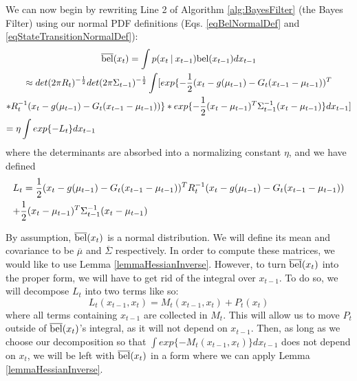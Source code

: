 We can now begin by rewriting Line 2 of Algorithm \ref{alg:BayesFilter} (the Bayes Filter) using our normal PDF definitions (Eqs. \ref{eqBelNormalDef} and \ref{eqStateTransitionNormalDef}):
\begin{multline} \label{eqBelBarLt}
\overline{\bel}(x_t) = \int p(x_t \mathbin{\vert} x_{t-1}) \bel(x_{t-1})dx_{t-1} \\
\approx det(2 \pi R_t)^{-\frac{1}{2}} det(2 \pi \Sigma_{t-1})^{-\frac{1}{2}} \int [ exp\{-\frac{1}{2} (x_t - g(\mu_{t-1}) - G_t (x_{t-1} - \mu_{t-1}))^T \\ * R_t^{-1} (x_t - g(\mu_{t-1}) - G_t (x_{t-1} - \mu_{t-1}))\} * exp \{-\frac{1}{2} (x_t - \mu_{t-1})^T \Sigma_{t-1}^{-1} (x_t - \mu_{t-1}) \}dx_{t-1} ] \\
= \eta \int exp\{-L_t\}dx_{t-1} \hfill
\end{multline}
where the determinants are absorbed into a normalizing constant \(\eta\), and we have defined
\begin{multline}
L_t = \frac{1}{2} (x_t - g(\mu_{t-1}) - G_t (x_{t-1} - \mu_{t-1}))^T R_t^{-1} (x_t - g(\mu_{t-1}) - G_t (x_{t-1} - \mu_{t-1}))\\
+ \frac{1}{2} (x_t - \mu_{t-1})^T \Sigma_{t-1}^{-1} (x_t - \mu_{t-1}) \hfill
\end{multline}

By assumption, \(\overline{\mathrm{bel}}(x_t)\) is a normal distribution. We will define its mean and covariance to be \(\overline{\mu}\) and \(\overline{\Sigma}\) respectively. In order to compute these matrices, we would like to use Lemma \ref{lemmaHessianInverse}. However, to turn \(\overline{\mathrm{bel}}(x_t)\) into the proper form, we will have to get rid of the integral over \(x_{t-1}\). To do so, we will decompose \(L_t\) into two terms like so: \begin{equation} \label{eqLtDecomp}
L_t(x_{t-1},x_t) = M_t(x_{t-1},x_t) + P_t(x_t)
\end{equation}
where all terms containing \(x_{t-1}\) are collected in \(M_t\). This will allow us to move \(P_t\) outside of \(\overline{\mathrm{bel}}(x_t)\)'s integral, as it will not depend on \(x_{t-1}\). Then, as long as we choose our decomposition so that \(\int exp\{ -M_t(x_{t-1},x_t)\}dx_{t-1}\) does not depend on \(x_t\), we will be left with \(\overline{\mathrm{bel}}(x_t)\) in a form where we can apply Lemma \ref{lemmaHessianInverse}.


